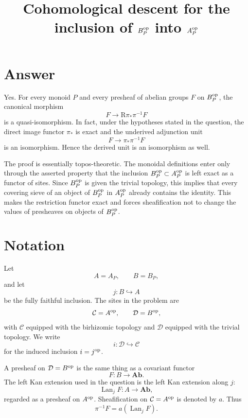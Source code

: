 \documentclass{article}
\theoremstyle{remark}
\begin{document}
\title{Cohomological descent for the inclusion of \(B_P^{\rm op}\) into \(A_P^{\rm op}\)}
\author{}
\maketitle

\section{Answer}

Yes.  For every monoid \(P\) and every presheaf of abelian groups
\(F\) on \(B_P^{\rm op}\), the canonical morphism
\[
F \longrightarrow \mathrm R\pi_\ast\pi^{-1}F
\]
is a quasi-isomorphism.  In fact, under the hypotheses stated in the
question, the direct image functor \(\pi_\ast\) is exact and the
underived adjunction unit
\[
F \longrightarrow \pi_\ast\pi^{-1}F
\]
is an isomorphism.  Hence the derived unit is an isomorphism as well.

The proof is essentially topos-theoretic.  The monoidal definitions
enter only through the asserted property that the inclusion
\(B_P^{\rm op}\subset A_P^{\rm op}\) is left exact as a functor of
sites.  Since \(B_P^{\rm op}\) is given the trivial topology, this
implies that every covering sieve of an object of \(B_P^{\rm op}\) in
\(A_P^{\rm op}\) already contains the identity.  This makes the
restriction functor exact and forces sheafification not to change the
values of presheaves on objects of \(B_P^{\rm op}\).

\section{Notation}

Let
\[
A=A_P,\qquad B=B_P,
\]
and let
\[
j:B\hookrightarrow A
\]
be the fully faithful inclusion.  The sites in the problem are
\[
\mathcal C=A^{\rm op},\qquad \mathcal D=B^{\rm op},
\]
with \(\mathcal C\) equipped with the birhizomic topology and
\(\mathcal D\) equipped with the trivial topology.  We write
\[
i:\mathcal D\hookrightarrow \mathcal C
\]
for the induced inclusion \(i=j^{\rm op}\).

A presheaf on \(\mathcal D=B^{\rm op}\) is the same thing as a covariant
functor
\[
F:B\longrightarrow \mathbf{Ab}.
\]
The left Kan extension used in the question is the left Kan extension
along \(j\):
\[
\operatorname{Lan}_j F:A\longrightarrow \mathbf{Ab},
\]
regarded as a presheaf on \(A^{\rm op}\).  Sheafification on
\(\mathcal C=A^{\rm op}\) is denoted by \(a\).  Thus
\[
\pi^{-1}F = a(\operatorname{Lan}_j F).
\]
\end{document}
